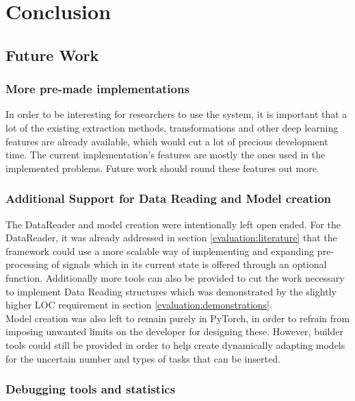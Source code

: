 \chapter{Conclusion}



\section{Future Work}

\subsection{More pre-made implementations}

In order to be interesting for researchers to use the system, it is important that a lot of the existing extraction methods, transformations and other deep learning features are already available, which would cut a lot of precious development time. The current implementation's features are mostly the ones used in the implemented problems. Future work should round these features out more.

\subsection{Additional Support for Data Reading and Model creation}

The DataReader and model creation were intentionally left open ended. For the DataReader, it was already addressed in section \ref{evaluation:literature} that the framework could use a more scalable way of implementing and expanding pre-processing of signals which in its current state is offered through an optional function. Additionally more tools can also be provided to cut the work necessary to implement Data Reading structures which was demonstrated by the slightly higher LOC requirement in section \ref{evaluation:demonstrations}. \\

Model creation was also left to remain purely in PyTorch, in order to refrain from imposing unwanted limits on the developer for designing these. However, builder tools could still be provided in order to help create dynamically adapting models for the uncertain number and types of tasks that can be inserted.\\

\subsection{Debugging tools and statistics}

